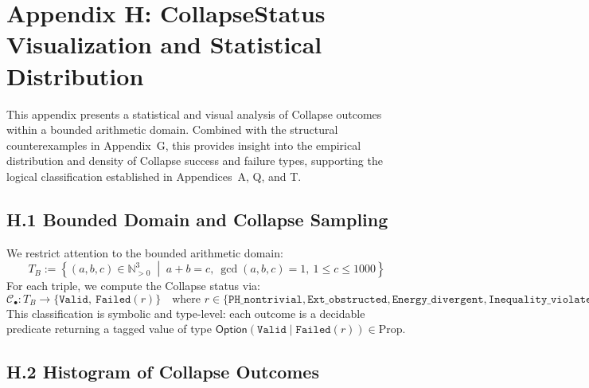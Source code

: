 \documentclass[11pt]{article}
\begin{document}
\section*{Appendix H: CollapseStatus Visualization and Statistical Distribution}

This appendix presents a statistical and visual analysis of Collapse outcomes  
within a bounded arithmetic domain. Combined with the structural counterexamples in Appendix~G,  
this provides insight into the empirical distribution and density of Collapse success and failure  
types, supporting the logical classification established in Appendices~A, Q, and T.

\subsection*{H.1 Bounded Domain and Collapse Sampling}

We restrict attention to the bounded arithmetic domain:
\[
T_B := \left\{ (a,b,c) \in \mathbb{N}_{>0}^3 \;\middle|\; a + b = c,\ \gcd(a,b,c)=1,\ 1 \leq c \leq 1000 \right\}
\]
For each triple, we compute the Collapse status via:
\[
\mathcal{C}_\bullet : T_B \longrightarrow \{ \texttt{Valid},\ \texttt{Failed}(r) \}
\quad \text{where } r \in \{\texttt{PH\_nontrivial}, \texttt{Ext\_obstructed}, \texttt{Energy\_divergent}, \texttt{Inequality\_violated}\}
\]
This classification is symbolic and type-level: each outcome is a decidable predicate  
returning a tagged value of type \( \mathsf{Option}(\texttt{Valid} \;|\; \texttt{Failed}(r)) \in \mathrm{Prop} \).

\subsection*{H.2 Histogram of Collapse Outcomes}

\begin{center}
\end{center}
\end{document}
